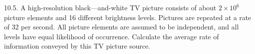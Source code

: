 \documentclass[a4]{beamer}
\begin{document}
\begin{frame}
10.5. A high-resolution black—and-white TV picture consists of about $2 \times 10^6$  picture elements and 16
different brightness levels. Pictures are repeated at a rate of 32 per second. All picture elements
are assumed to be independent, and all levels have equal likelihood of occurrence. Calculate the
average rate of information conveyed by this TV picture source.\\ \bigskip


\end{frame}
\end{document}
